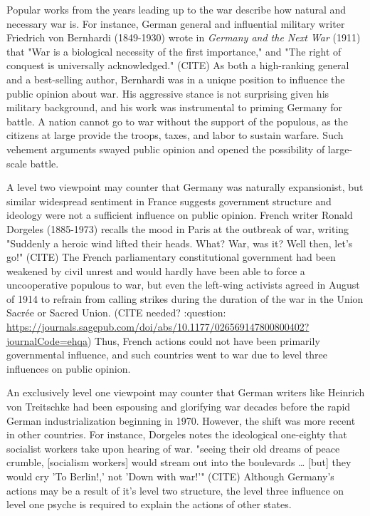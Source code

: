 \documentclass[letterpaper]{article}
\begin{document}
Popular works from the years leading up to the war describe how natural and necessary war is.
For instance, German general and influential military writer Friedrich von Bernhardi (1849-1930) wrote in \emph{Germany and the Next War} (1911) that "War is a biological necessity of the first importance," and "The right of conquest is universally acknowledged." (CITE)
As both a high-ranking general and a best-selling author, Bernhardi was in a unique position to influence the public opinion about war. His aggressive stance is not surprising given his military background, and his work was instrumental to priming Germany for battle. A nation cannot go to war without the support of the populous, as the citizens at large provide the troops, taxes, and labor to sustain warfare. Such vehement arguments swayed public opinion and opened the possibility of large-scale battle.

A level two viewpoint may counter that Germany was naturally expansionist, but similar widespread sentiment in France suggests government structure and ideology were not a sufficient influence on public opinion. French writer Ronald Dorgeles (1885-1973) recalls the mood in Paris at the outbreak of war, writing "Suddenly a heroic wind lifted their heads. What? War, was it? Well then, let's go!" (CITE)
The French parliamentary constitutional government had been weakened by civil unrest and would hardly have been able to force a uncooperative populous to war, but even the left-wing activists agreed in August of 1914 to refrain from calling strikes during the duration of the war in the Union Sacrée or Sacred Union. (CITE needed? :question: \url{https://journals.sagepub.com/doi/abs/10.1177/026569147800800402?journalCode=ehqa}) Thus, French actions could not have been primarily governmental influence, and such countries went to war due to level three influences on public opinion.

An exclusively level one viewpoint may counter that German writers like Heinrich von Treitschke had been espousing and glorifying war decades before the rapid German industrialization beginning in 1970. However, the shift was more recent in other countries. For instance, Dorgeles notes the ideological one-eighty that socialist workers take upon hearing of war. "seeing their old dreams of peace crumble, [socialism workers] would stream out into the boulevards \ldots{} [but] they would cry 'To Berlin!,' not 'Down with war!'" (CITE) Although Germany's actions may be a result of it's level two structure, the level three influence on level one psyche is required to explain the actions of other states.
\end{document}
